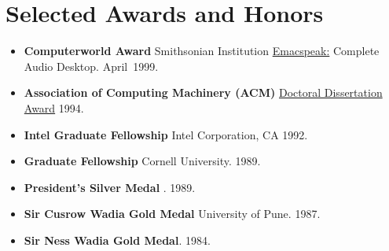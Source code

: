 \documentclass{article}
\begin{document}
\section*{Selected Awards and Honors}
\begin{itemize}
\item \textbf{Computerworld Award} {Smithsonian Institution}
  \href{http://emacspeak.sf.net}{Emacspeak:} Complete Audio
  Desktop. \hfill April~1999.
\item \textbf{Association of Computing Machinery (ACM)}
  \href{http://www.acm.org/awards/dd_citation/1994B.html}{%
    Doctoral Dissertation Award} \hfill1994.
\item \textbf{Intel Graduate Fellowship} {Intel Corporation, CA}
  \hfill 1992.
\item \textbf{Graduate Fellowship} Cornell University.  \hfill
  1989.
\item \textbf{President's Silver Medal} {\iitb}.  \hfill 1989.
\item \textbf{Sir Cusrow Wadia Gold Medal} {University of Pune}.
  \hfill 1987.
\item \textbf{Sir Ness Wadia Gold Medal}.  \hfill 1984.
  \vspace*{-6pt}
\end{itemize}
\end{document}
